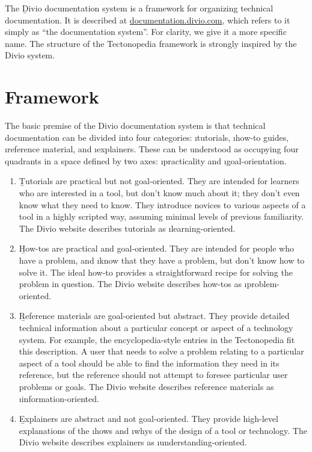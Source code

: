 
The \b{Divio documentation system} is a framework for organizing technical
documentation. It is described at
\href{https://documentation.divio.com/}{documentation.divio.com}, which refers
to it simply as “the documentation system”. For clarity, we give it a more
specific name. The structure of the Tectonopedia framework is strongly inspired
by the Divio system.


\section*{Framework}

The basic premise of the Divio documentation system is that technical
documentation can be divided into four categories: \i{tutorials}, \i{how-to
guides}, \i{reference material}, and \i{explainers}. These can be understood as
occupying four quadrants in a space defined by two axes: \i{practicality} and
\i{goal-orientation}.

\begin{enumerate}
  \item \b{Tutorials} are practical but not goal-oriented. They are intended for
  learners who are interested in a tool, but don't know much about it; they
  don't even know what they need to know. They introduce novices to various
  aspects of a tool in a highly scripted way, assuming minimal levels of
  previous familiarity. The Divio website describes tutorials as
  \i{learning-oriented}.

  \item \b{How-tos} are practical and goal-oriented. They are intended for
  people who have a problem, and \i{know} that they have a problem, but don't
  know how to solve it. The ideal how-to provides a straightforward recipe for
  solving the problem in question. The Divio website describes how-tos as
  \i{problem-oriented}.

  \item \b{Reference materials} are goal-oriented but abstract. They provide
  detailed technical information about a particular concept or aspect of a
  technology system. For example, the encyclopedia-style entries in the
  Tectonopedia fit this description.  A user that needs to solve a problem
  relating to a particular aspect of a tool should be able to find the
  information they need in its reference, but the reference should not attempt
  to foresee particular user problems or goals. The Divio website describes
  reference materials as \i{information-oriented}.

  \item \b{Explainers} are abstract and not goal-oriented. They provide
  high-level explanations of the \i{hows} and \i{whys} of the design of a tool
  or technology. The Divio website describes explainers as
  \i{understanding-oriented}.
\end{enumerate}


